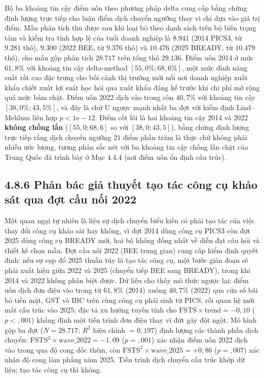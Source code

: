 \documentclass[
  a4paper,
  13pt]{extreport}
\begin{document}
Bộ ba khoảng tin cậy điểm uốn theo phương pháp delta cung cấp bằng chứng
định lượng trực tiếp cho luận điểm dịch chuyển ngưỡng thay vì chỉ dựa
vào giá trị điểm. Mẫu phân tích thu được sau khi loại bỏ theo danh sách
trên bộ biến trọng tâm và kiểm tra tính hợp lệ của tuổi doanh nghiệp là
\(8.941\) (2014 PICS3, từ \(9.281\) thô), \(9.300\) (2022 BEE, từ
\(9.376\) thô) và \(10.476\) (2025 BREADY, từ \(10.479\) thô), cho mẫu
gộp phân tích \(28.717\) trên tổng thô \(29.136\). Điểm uốn 2014 ở mức
\(61{,}8\%\) với khoảng tin cậy delta-method \([55{,}0\%; 68{,}6\%]\),
một mức đỉnh năng suất rất cao đặc trưng cho bối cảnh thị trường mới nổi
nơi doanh nghiệp xuất khẩu chiết xuất lợi suất học hỏi qua xuất khẩu
đáng kể trước khi chi phí mở rộng quá mức bám chặt. Điểm uốn 2022 dịch
vào trong còn \(40{,}7\%\) với khoảng tin cậy \([38{,}0\%; 43{,}5\%]\),
và đây là chữ U ngược mạnh nhất ba đợt với kiểm định Lind--Mehlum liên
hợp \(p < 1\mathrm{e}{-}12\). Điểm cốt lõi là hai khoảng tin cậy 2014 và
2022 \textbf{không chồng lấn} (\([55{,}0; 68{,}6]\) so với
\([38{,}0; 43{,}5]\)), bằng chứng định lượng trực tiếp rằng dịch chuyển
ngưỡng \(21\) điểm phần trăm là thực chứ không phải nhiễu ước lượng,
tương phản sắc nét với ba khoảng tin cậy chồng lấn chặt của Trung Quốc
đã trình bày ở Mục 4.4.4 (nơi điểm uốn ổn định cấu trúc).

\hypertarget{phux1ea3n-buxe1c-giux1ea3-thuyux1ebft-tux1ea1o-tuxe1c-cuxf4ng-cux1ee5-khux1ea3o-suxe1t-qua-ux111ux1ee3t-cux1ea7u-nux1ed1i-2022}{%
\subsection{4.8.6 Phản bác giả thuyết tạo tác công cụ khảo sát qua đợt
cầu nối
2022}\label{phux1ea3n-buxe1c-giux1ea3-thuyux1ebft-tux1ea1o-tuxe1c-cuxf4ng-cux1ee5-khux1ea3o-suxe1t-qua-ux111ux1ee3t-cux1ea7u-nux1ed1i-2022}}

Một quan ngại tự nhiên là liệu sự dịch chuyển biểu kiến có phải tạo tác
của việc thay đổi công cụ khảo sát hay không, vì đợt 2014 dùng công cụ
PICS3 còn đợt 2025 dùng công cụ BREADY mới, hai bộ không đồng nhất về
diễn đạt câu hỏi và thiết kế chọn mẫu. Đợt cầu nối 2022 (BEE trung gian)
cung cấp kiểm định quyết định: nếu sự sụp đổ 2025 thuần túy là tạo tác
công cụ, một bước gián đoạn sẽ phải xuất hiện giữa 2022 và 2025 (chuyển
tiếp BEE sang BREADY), trong khi 2014 và 2022 không phân biệt được. Dữ
liệu cho thấy mô thức ngược lại: điểm uốn dịch đơn điệu vào trong từ
\(61{,}8\%\) (2014) xuống \(40{,}7\%\) (2022) qua cửa sổ bãi bỏ tiền
mặt, GST và IBC trên cùng công cụ phái sinh từ PICS, rồi quan hệ mới mất
cấu trúc vào 2025; đặc tả xu hướng tuyến tính cho
\(\mathrm{FSTS} \times \mathrm{trend} = -0{,}10\) (\(p < {,}001\)) khẳng
định một tiến trình đơn điệu thay vì đứt gãy đột ngột. Mô hình gộp ba
đợt (\(N = 28.717\); \(R^2\) hiệu chỉnh \(= 0{,}197\)) định lượng các
thành phần dịch chuyển:
\(\mathrm{FSTS}^2 \times \mathrm{wave}\_2022 = -1{,}09\)
(\(p = {,}001\)) xác nhận điểm uốn 2022 dịch vào trong qua độ cong dốc
thêm, còn \(\mathrm{FSTS}^2 \times \mathrm{wave}\_2025 = +0{,}86\)
(\(p = {,}007\)) xác nhận độ cong làm phẳng năm 2025. Tiến trình dịch
chuyển cấu trúc khớp dữ liệu; tạo tác công cụ thì không.
\end{document}
